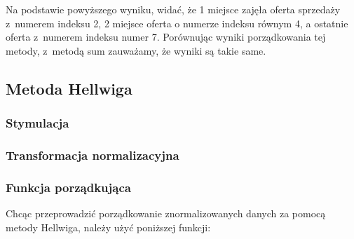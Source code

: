 \documentclass[12pt,a4paper]{report}
\begin{document}
{Na podstawie powyższego wyniku, widać, że 1 miejsce zajęła oferta
sprzedaży z~numerem indeksu 2, 2 miejsce oferta o numerze indeksu równym 4, a ostatnie oferta z~numerem indeksu numer 7. Porównując wyniki porządkowania tej metody, z~metodą sum zauważamy, że wyniki są takie same. 

\subsection{Metoda Hellwiga}
\subsubsection{Stymulacja} 
\begin{Shaded}
\begin{Highlighting}[]
\NormalTok{)} 
\end{Highlighting}
\end{Shaded}


\subsubsection{Transformacja normalizacyjna}
\begin{Shaded}
\begin{Highlighting}[]
\end{Highlighting}
\end{Shaded}

\subsubsection{Funkcja porządkująca}\label{funkcja-porzadkujaca-metoda-Hellwiga}

Chcąc przeprowadzić porządkowanie znormalizowanych danych za pomocą metody Hellwiga, należy użyć poniższej funkcji:

}
\end{document}
